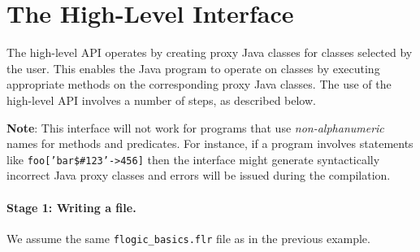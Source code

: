 \section{The High-Level Interface}

The high-level API operates by creating proxy Java classes for 
\FLSYSTEM classes selected by the user.
This enables the Java program to operate on \FLSYSTEM classes by
executing appropriate methods on the corresponding proxy Java classes.
The use of the high-level API involves a number of steps, as described below.

\textbf{Note}: This interface will not work for \FLSYSTEM programs that
use \emph{non-alphanumeric} names for methods and predicates. For instance,
if a program involves statements like \texttt{foo['bar\$\#123'->456]} then
the interface might generate syntactically incorrect Java proxy classes and
errors will be issued during the compilation. 

\paragraph{Stage 1: Writing a \FLSYSTEM file.}
We assume the same {\tt flogic\_basics.flr} file as in the previous
example.

